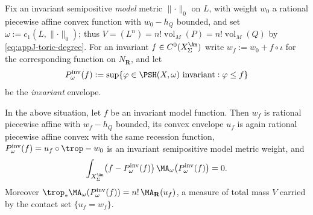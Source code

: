 Fix an invariant semipositive \emph{model} metric \(\lVert\cdot\rVert_0\) on
\(L\), with weight \(w_0\) a rational piecewise affine convex function with
\(w_0-h_Q\) bounded, and set \(\omega:=c_1(L,\lVert\cdot\rVert_0)\); thus
\(V=(L^n)=n!\operatorname{vol}_M(P)=n!\operatorname{vol}_M(Q)\) by
\eqref{eq:appJ-toric-degree}.  For an invariant \(f\in C^0(X_\Sigma^{\An})\)
write \(w_f:=w_0+f\circ\iota\) for the corresponding function on
\(N_{\mathbf R}\), and let
\begin{equation}\label{eq:ch27-invariant-envelope}
 P^{\mathrm{inv}}_\omega(f):=
 \sup\{\varphi\in\PSH(X,\omega)\ \text{invariant}:\varphi\leq f\}
\end{equation}
be the \emph{invariant} envelope.

\begin{theorem}
\label{thm:ch27-toric-orthogonality}
In the above situation, let \(f\) be an invariant model function.  Then
\(w_f\) is rational piecewise affine with \(w_f-h_Q\) bounded, its convex
envelope \(u_f\) is again rational piecewise affine convex with the same
recession function, \(P^{\mathrm{inv}}_\omega(f)=u_f\circ\trop-w_0\) is an invariant
semipositive model metric weight, and
\begin{equation}\label{eq:ch27-toric-orthogonality}
 \int_{X_\Sigma^{\An}}
   \bigl(f-P^{\mathrm{inv}}_\omega(f)\bigr)\,
   \MA_\omega\bigl(P^{\mathrm{inv}}_\omega(f)\bigr)=0 .
\end{equation}
Moreover
\(\trop_*\MA_\omega(P^{\mathrm{inv}}_\omega(f))=n!\,\MA_{\mathbf R}(u_f)\), a
measure of total mass \(V\) carried by the contact set
\(\{u_f=w_f\}\).
\end{theorem}

